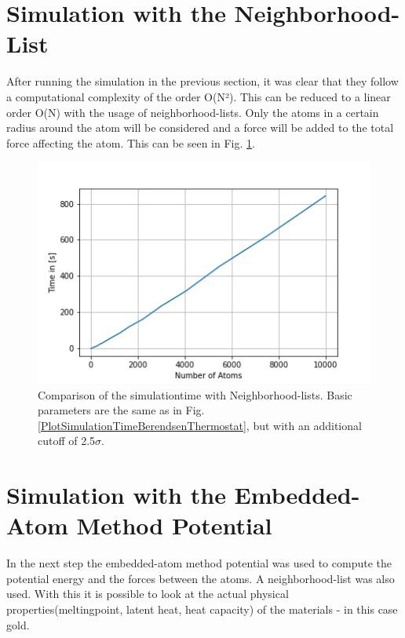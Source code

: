 \section{Simulation with the Neighborhood-List}

After running the simulation in the previous section, it was clear that they follow a computational complexity of the order O(N²). This can be reduced to a linear order O(N) with the usage of neighborhood-lists. Only the atoms in a certain radius around the atom will be considered and a force will be added to the total force affecting the atom. This can be seen in Fig. \ref{PlotSimulationTimesCutoffNew}.
\begin{figure}
	\begin{center}
		\includegraphics[scale=1.25]{Figure/plotAtomTimesM6.png}
	\end{center}
	\caption[Comparison of the simulationtime with neighborhood-lists ]{Comparison of the simulationtime with Neighborhood-lists. Basic parameters are the same as in Fig. \ref{PlotSimulationTimeBerendsenThermostat}, but with an additional cutoff of 2.5$\sigma$.}
	\label{PlotSimulationTimesCutoffNew}
\end{figure}

\section{Simulation with the Embedded-Atom Method Potential}

In the next step the embedded-atom method potential was used to compute the potential energy and the forces between the atoms. A neighborhood-list was also used. With this it is possible to look at the actual physical properties(meltingpoint, latent heat, heat capacity) of the materials - in this case gold. 

